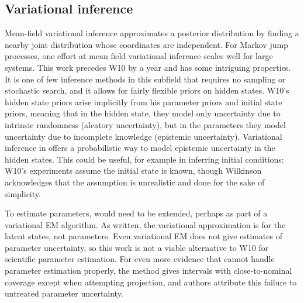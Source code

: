 \documentclass{article}
\begin{document}
\subsection{Variational inference}
Mean-field variational inference approximates a posterior distribution by finding a nearby joint distribution whose coordinates are independent. For Markov jump processes, one effort at mean field variational inference \cite{opper2008variational} scales well for large systems. This work precedes W10 by a year and has some intriguing properties. It is one of few inference methods in this subfield that requires no sampling or stochastic search, and it allows for fairly flexible priors on hidden states. W10's hidden state priors arise implicitly from his parameter priors and initial state priors, meaning that in the hidden state, they model only uncertainty due to intrinsic randomness (aleatory uncertainty), but in the parameters they model uncertainty due to incomplete knowledge (epistemic uncertainty). Variational inference in \cite{opper2008variational} offers a probabilistic way to model epistemic uncertainty in the hidden states. This could be useful, for example in inferring initial conditions: W10's experiments assume the initial state is known, though Wilkinson acknowledges that the assumption is unrealistic and done for the sake of simplicity.

To estimate parameters, \cite{opper2008variational} would need to be extended, perhaps as part of a variational EM algorithm. As written, the variational approximation is for the latent states, not parameters. Even variational EM does not give estimates of parameter uncertainty, so this work is not a viable alternative to W10 for scientific parameter estimation. For even more evidence that \cite{opper2008variational} cannot handle parameter estimation properly, the method gives intervals with close-to-nominal coverage except when attempting projection, and authors attribute this failure to untreated parameter uncertainty. 
\end{document}
